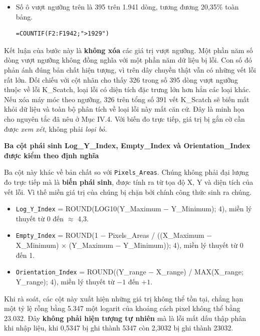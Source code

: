 \documentclass[12pt]{article}
\begin{document}
\begin{itemize}
    \item Số ô vượt ngưỡng trên là 395 trên 1.941 dòng, tương đương 20,35\% toàn bảng.
    \begin{aivncodebox}
    \begin{lstlisting}[language=Excel]
=COUNTIF(F2:F1942;">1929")\end{lstlisting}
    \end{aivncodebox}
\end{itemize}

\noindent
Kết luận của bước này là \textbf{không xóa} các giá trị vượt ngưỡng. Một phần năm số dòng vượt ngưỡng không đồng nghĩa với một phần năm dữ liệu bị lỗi. Con số đó phản ánh đúng bản chất hiện tượng, vì trên dây chuyền thật vẫn có những vết lỗi rất lớn. Đối chiếu với cột nhãn cho thấy 326 trong số 395 dòng vượt ngưỡng thuộc về lỗi K\_Scatch, loại lỗi có diện tích đặc trưng lớn hơn hẳn các loại khác. Nếu xóa máy móc theo ngưỡng, 326 trên tổng số 391 vết K\_Scatch sẽ biến mất khỏi dữ liệu và toàn bộ phân tích về loại lỗi này mất căn cứ. Đây là minh họa cho nguyên tắc đã nêu ở Mục IV.4. Với biến đo trực tiếp, giá trị bị gắn cờ cần được \emph{xem xét}, không phải \emph{loại bỏ}.

\noindent
\textbf{Ba cột phái sinh Log\_Y\_Index, Empty\_Index và Orientation\_Index được kiểm theo định nghĩa}

\noindent
Ba cột này khác về bản chất so với \texttt{Pixels\_Areas}. Chúng không phải đại lượng đo trực tiếp mà là \textbf{biến phái sinh}, được tính ra từ tọa độ X, Y và diện tích của vết lỗi. Vì thế miền giá trị của chúng bị chặn bởi chính công thức sinh ra chúng.
\begin{itemize}
    \item \texttt{Log\_Y\_Index} = ROUND(LOG10(Y\_Maximum $-$ Y\_Minimum); 4), miền lý thuyết từ 0 đến $\approx$ 4,3.
    \item \texttt{Empty\_Index} = ROUND(1 $-$ Pixels\_Areas / ((X\_Maximum $-$ X\_Minimum) $\times$ (Y\_Maximum $-$ Y\_Minimum)); 4), miền lý thuyết từ 0 đến 1.
    \item \texttt{Orientation\_Index} = ROUND((Y\_range $-$ X\_range) / MAX(X\_range; Y\_range); 4), miền lý thuyết từ $-1$ đến $+1$.
\end{itemize}

\noindent
Khi rà soát, các cột này xuất hiện những giá trị không thể tồn tại, chẳng hạn một tỷ lệ rỗng bằng 5.347 một logarit của khoảng cách pixel không thể bằng 23.032. Đây \textbf{không phải hiện tượng tự nhiên} mà là lỗi mất dấu thập phân khi nhập liệu, khi 0,5347 bị ghi thành 5347 còn 2,3032 bị ghi thành 23032.
\end{document}
